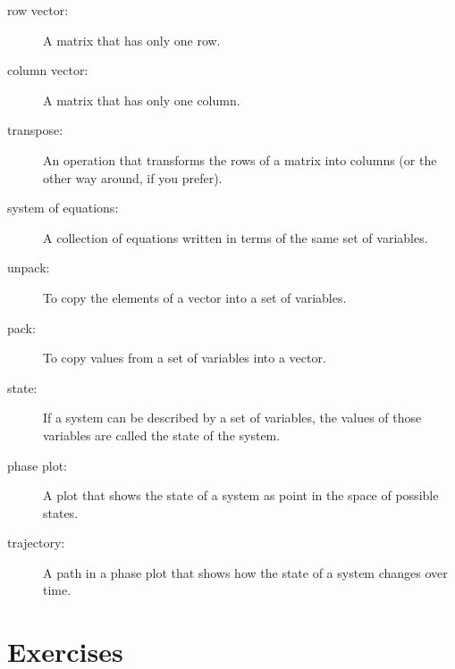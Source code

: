 \documentclass[
]{book}
\numberwithin{Answer}{chapter}
\numberwithin{Exercise}{chapter}
\begin{document}
\begin{description}

\item[row vector:] A matrix that has only one row.

\item[column vector:] A matrix that has only one column.

\item[transpose:] An operation that transforms the rows of a matrix
into columns (or the other way around, if you prefer).

\item[system of equations:] A collection of equations written in terms of
the same set of variables.

\item[unpack:] To copy the elements of a vector into a set of variables.

\item[pack:] To copy values from a set of variables into a vector.

\item[state:] If a system can be described by a set of variables,
the values of those variables are called the state of the system.

\item[phase plot:] A plot that shows the state of a system as point
in the space of possible states.

\item[trajectory:] A path in a phase plot that shows how the state of
a system changes over time.


\end{description}

\section{Exercises}
\end{document}
